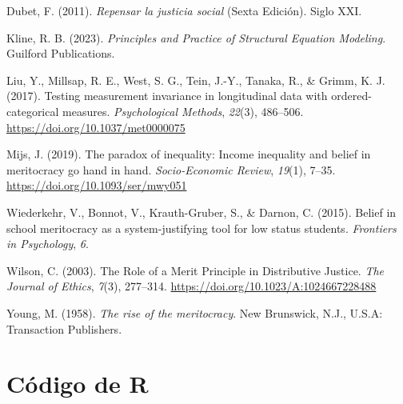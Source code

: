 \documentclass[
  12pt,
]{article}
\newlength{\cslhangindent}
\newenvironment{CSLReferences}[2] %
 {\begin{list}{}{%
  \setlength{\itemindent}{0pt}
  \setlength{\leftmargin}{0pt}
  \setlength{\parsep}{0pt}
  \ifodd #1
   \setlength{\leftmargin}{\cslhangindent}
   \setlength{\itemindent}{-1\cslhangindent}
  \fi
  \setlength{\itemsep}{#2\baselineskip}}}
 {\end{list}}
\begin{document}
\begin{CSLReferences}{1}{0}
Dubet, F. (2011). \emph{{Repensar la justicia social}} (Sexta
Edici{ó}n). Siglo XXI.

Kline, R. B. (2023). \emph{Principles and {Practice} of {Structural
Equation Modeling}}. Guilford Publications.

Liu, Y., Millsap, R. E., West, S. G., Tein, J.-Y., Tanaka, R., \& Grimm,
K. J. (2017). Testing measurement invariance in longitudinal data with
ordered-categorical measures. \emph{Psychological Methods},
\emph{22}(3), 486--506. \url{https://doi.org/10.1037/met0000075}

Mijs, J. (2019). The paradox of inequality: Income inequality and belief
in meritocracy go hand in hand. \emph{Socio-Economic Review},
\emph{19}(1), 7--35. \url{https://doi.org/10.1093/ser/mwy051}

Wiederkehr, V., Bonnot, V., Krauth-Gruber, S., \& Darnon, C. (2015).
Belief in school meritocracy as a system-justifying tool for low status
students. \emph{Frontiers in Psychology}, \emph{6}.

Wilson, C. (2003). The {Role} of a {Merit Principle} in {Distributive
Justice}. \emph{The Journal of Ethics}, \emph{7}(3), 277--314.
\url{https://doi.org/10.1023/A:1024667228488}

Young, M. (1958). \emph{The rise of the meritocracy}. New Brunswick,
N.J., U.S.A: Transaction Publishers.

\end{CSLReferences}

\pagebreak

\section{Código de R}\label{cuxf3digo-de-r}
\end{document}

